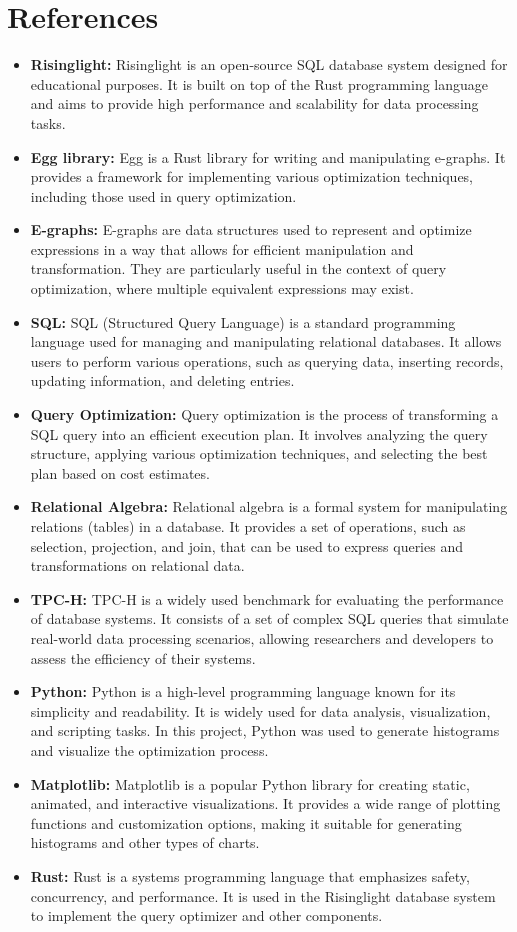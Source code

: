 \documentclass[a4paper,12pt]{scrreprt}
\begin{document}
\section{References}
\begin{itemize}
    \item \textbf{Risinglight:} Risinglight is an open-source SQL database system designed for educational purposes. It is built on top of the Rust programming language and aims to provide high performance and scalability for data processing tasks.
    \item \textbf{Egg library:} Egg is a Rust library for writing and manipulating e-graphs. It provides a framework for implementing various optimization techniques, including those used in query optimization.
    \item \textbf{E-graphs:} E-graphs are data structures used to represent and optimize expressions in a way that allows for efficient manipulation and transformation. They are particularly useful in the context of query optimization, where multiple equivalent expressions may exist.
    \item \textbf{SQL:} SQL (Structured Query Language) is a standard programming language used for managing and manipulating relational databases. It allows users to perform various operations, such as querying data, inserting records, updating information, and deleting entries.
    \item \textbf{Query Optimization:} Query optimization is the process of transforming a SQL query into an efficient execution plan. It involves analyzing the query structure, applying various optimization techniques, and selecting the best plan based on cost estimates.
    \item \textbf{Relational Algebra:} Relational algebra is a formal system for manipulating relations (tables) in a database. It provides a set of operations, such as selection, projection, and join, that can be used to express queries and transformations on relational data.
    \item \textbf{TPC-H:} TPC-H is a widely used benchmark for evaluating the performance of database systems. It consists of a set of complex SQL queries that simulate real-world data processing scenarios, allowing researchers and developers to assess the efficiency of their systems.
    \item \textbf{Python:} Python is a high-level programming language known for its simplicity and readability. It is widely used for data analysis, visualization, and scripting tasks. In this project, Python was used to generate histograms and visualize the optimization process.
    \item \textbf{Matplotlib:} Matplotlib is a popular Python library for creating static, animated, and interactive visualizations. It provides a wide range of plotting functions and customization options, making it suitable for generating histograms and other types of charts.
    \item \textbf{Rust:} Rust is a systems programming language that emphasizes safety, concurrency, and performance. It is used in the Risinglight database system to implement the query optimizer and other components.
\end{itemize}
\end{document}
